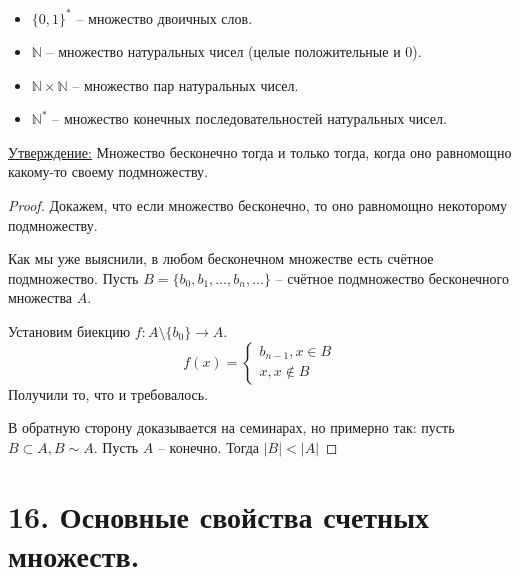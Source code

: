 \documentclass[a4paper, 12pt]{article}
\newcommand{\statement}{\underline{Утверждение:} }
\newcommand{\N}{\mathbb{N}}
\begin{document}
\begin{itemize}
        \item $\{ 0, 1\}^*$ -- множество двоичных слов.
        \item $\N$ -- множество натуральных чисел (целые положительные и 0).
        \item $\N \times \N$ -- множество пар натуральных чисел.
        \item $\N^*$ -- множество конечных последовательностей натуральных чисел.
\end{itemize}

\statement Множество бесконечно тогда и только тогда, когда оно равномощно какому-то 
своему подмножеству.
\begin{proof}
    Докажем, что если множество бесконечно, то оно равномощно некоторому подмножеству.

    Как мы уже выяснили, в любом бесконечном множестве есть счётное подмножество.
    Пусть $B = \{b_0, b_1, \ldots, b_n, \ldots\}$ -- счётное подмножество
    бесконечного множества $A$.

    Установим биекцию $f: A \setminus \{b_0\} \to A$.
    \[
    f(x) = \begin{cases}
        b_{n-1}, x \in B \\
        x, x \notin B
    \end{cases}
    \]
    Получили то, что и требовалось.

    В обратную сторону доказывается на семинарах, но примерно так:
    пусть $B \subset A, B \sim A$. Пусть $A$ -- конечно. Тогда $|B| < |A|$
\end{proof}

\section*{16. Основные свойства счетных множеств.}
\end{document}
